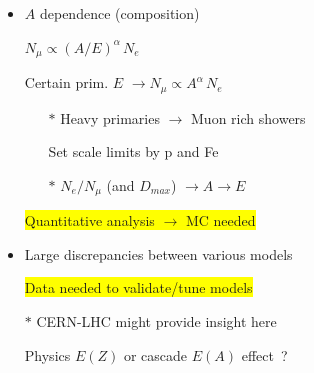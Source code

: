 \newpage

\begin{itemize}
\item $A$ dependence (composition)
\item[] $N_{\mu} \propto (A/E)^{\alpha}\,N_{e}$
\item[] Certain prim. $E$ $\rightarrow N_{\mu} \propto A^{\alpha}\,N_{e}$
\begin{itemize}
\item[$\ast$] {\blue Heavy primaries $\rightarrow$ Muon rich showers}
\item[] Set scale limits by p and Fe
\item[$\ast$] {\blue $N_{e}/N_{\mu}$ (and $D_{max}$) $\rightarrow A \rightarrow E$}
\end{itemize}
\item[] \colorbox{yellow}{Quantitative analysis $\rightarrow$ MC needed}
\item Large discrepancies between various models
\item[] \colorbox{yellow}{Data needed to validate/tune models}
\item[$\ast$] CERN-LHC might provide insight here
\item[] {\blue Physics $E(Z)$ or cascade $E(A)$ effect~?}
\end{itemize}
